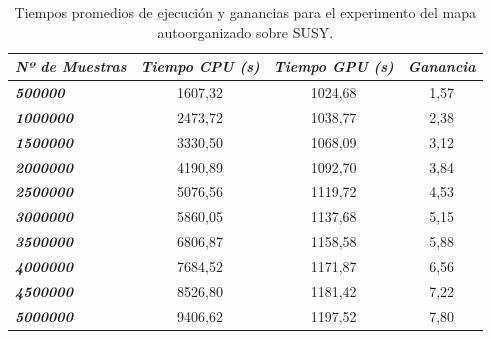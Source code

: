 \begin{table}[ht]
\begin{tabular}{@{}l|c|c|c@{}}
\textit{\textbf{Nº de Muestras}} & \multicolumn{1}{l|}{\textit{\textbf{Tiempo CPU (s)}}} & \multicolumn{1}{l|}{\textit{\textbf{Tiempo GPU (s)}}} & \multicolumn{1}{l}{\textit{\textbf{Ganancia}}} \\ \midrule
\textit{\textbf{500000}}         & 1607,32                                               & 1024,68                                               & 1,57                                           \\
\textit{\textbf{1000000}}        & 2473,72                                               & 1038,77                                               & 2,38                                           \\
\textit{\textbf{1500000}}        & 3330,50                                               & 1068,09                                               & 3,12                                           \\
\textit{\textbf{2000000}}        & 4190,89                                               & 1092,70                                               & 3,84                                           \\
\textit{\textbf{2500000}}        & 5076,56                                               & 1119,72                                               & 4,53                                           \\
\textit{\textbf{3000000}}        & 5860,05                                               & 1137,68                                               & 5,15                                           \\
\textit{\textbf{3500000}}        & 6806,87                                               & 1158,58                                               & 5,88                                           \\
\textit{\textbf{4000000}}        & 7684,52                                               & 1171,87                                               & 6,56                                           \\
\textit{\textbf{4500000}}        & 8526,80                                               & 1181,42                                               & 7,22                                           \\
\textit{\textbf{5000000}}        & 9406,62                                               & 1197,52                                               & 7,80                                          
\end{tabular}
\caption{Tiempos promedios de ejecución y ganancias para el experimento del mapa autoorganizado sobre SUSY.}
\label{tab:susysom}
\end{table}

